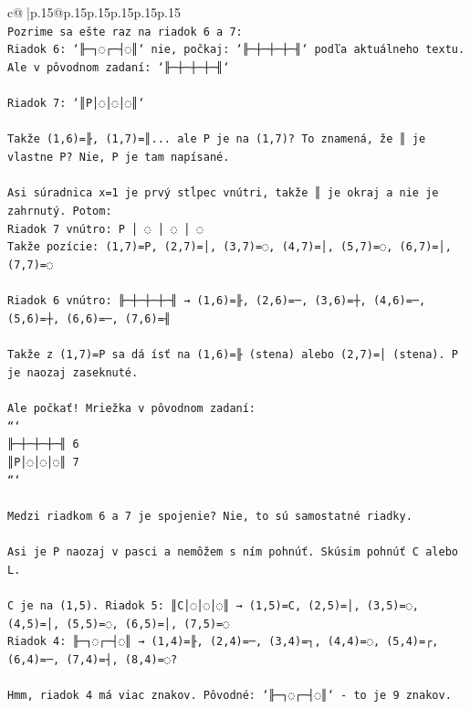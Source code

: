 \documentclass{article}
\begin{document}
{\begin{supertabular}{c@{$\;$}|p{.15\linewidth}@{}p{.15\linewidth}p{.15\linewidth}p{.15\linewidth}p{.15\linewidth}p{.15\linewidth}}
{{{\\ 
\texttt{Pozrime sa ešte raz na riadok 6 a 7:} \\
\texttt{Riadok 6: `╟─┐◌┌─┤◌║` nie, počkaj: `╟─┼─┼─┼─╢` podľa aktuálneho textu. Ale v pôvodnom zadaní: `╟─┼─┼─┼─╢`} \\
\\ 
\texttt{Riadok 7: `║P│◌│◌│◌║`} \\
\\ 
\texttt{Takže (1,6)=╟, (1,7)=║... ale P je na (1,7)? To znamená, že ║ je vlastne P? Nie, P je tam napísané.} \\
\\ 
\texttt{Asi súradnica x=1 je prvý stĺpec vnútri, takže ║ je okraj a nie je zahrnutý. Potom:} \\
\texttt{Riadok 7 vnútro: P │ ◌ │ ◌ │ ◌} \\
\texttt{Takže pozície: (1,7)=P, (2,7)=│, (3,7)=◌, (4,7)=│, (5,7)=◌, (6,7)=│, (7,7)=◌} \\
\\ 
\texttt{Riadok 6 vnútro: ╟─┼─┼─┼─╢ → (1,6)=╟, (2,6)=─, (3,6)=┼, (4,6)=─, (5,6)=┼, (6,6)=─, (7,6)=╢} \\
\\ 
\texttt{Takže z (1,7)=P sa dá ísť na (1,6)=╟ (stena) alebo (2,7)=│ (stena). P je naozaj zaseknuté.} \\
\\ 
\texttt{Ale počkať! Mriežka v pôvodnom zadaní:} \\
\texttt{```} \\
\texttt{╟─┼─┼─┼─╢ 6} \\
\texttt{║P│◌│◌│◌║ 7} \\
\texttt{```} \\
\\ 
\texttt{Medzi riadkom 6 a 7 je spojenie? Nie, to sú samostatné riadky. } \\
\\ 
\texttt{Asi je P naozaj v pasci a nemôžem s ním pohnúť. Skúsim pohnúť C alebo L.} \\
\\ 
\texttt{C je na (1,5). Riadok 5: ║C│◌│◌│◌║ → (1,5)=C, (2,5)=│, (3,5)=◌, (4,5)=│, (5,5)=◌, (6,5)=│, (7,5)=◌} \\
\texttt{Riadok 4: ╟─┐◌┌─┤◌║ → (1,4)=╟, (2,4)=─, (3,4)=┐, (4,4)=◌, (5,4)=┌, (6,4)=─, (7,4)=┤, (8,4)=◌?} \\
\\ 
\texttt{Hmm, riadok 4 má viac znakov. Pôvodné: `╟─┐◌┌─┤◌║` {-} to je 9 znakov.} \\
\\ 
}}}
\end{supertabular}}
\end{document}
